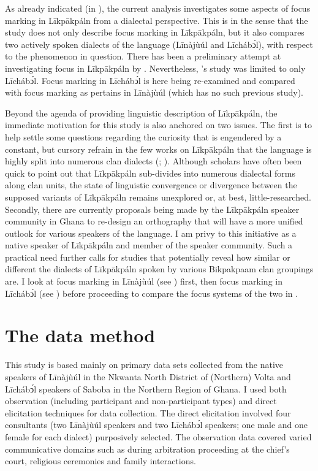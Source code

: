\documentclass[output=paper,colorlinks,citecolor=brown]{langscibook}
\begin{document}
As already indicated (in ), the current analysis investigates some aspects of focus marking in Līkpākpáln from a dialectal perspective. This is in the sense that the study does not only describe focus marking in Līkpākpáln, but it also compares two actively spoken dialects of the language (Līnàjùúl and Līchábͻ́l), with respect to the phenomenon in question. There has been a preliminary attempt at investigating focus in Līkpākpáln by \citet{Schwarz2009}. Nevertheless, \citeauthor{Schwarz2009}’s study was limited to only Līchábͻ́l. Focus marking in Līchábͻ́l is here being re-examined and compared with focus marking as pertains in Līnàjùúl (which has no such previous study).

Beyond the agenda of providing linguistic description of Līkpākpáln, the immediate motivation for this study is also anchored on two issues. The first is to help settle some questions regarding the curiosity that is engendered by a constant, but cursory refrain in the few works on Līkpākpáln that the language is highly split into numerous clan dialects (\citealt[182]{Schwarz2009}; \citealt[107]{Hasselbring2006}). Although scholars have often been quick to point out that Līkpākpáln sub-divides into numerous dialectal forms along clan units, the state of linguistic convergence or divergence between the supposed variants of Līkpākpáln remains unexplored or, at best, little-researched. Secondly, there are currently proposals being made by the Līkpākpáln speaker community in Ghana to re-design an orthography that will have a more unified outlook for various speakers of the language. I am privy to this initiative as a native speaker of Līkpākpáln and member of the speaker community. Such a practical need further calls for studies that potentially reveal how similar or different the dialects of Līkpākpáln spoken by various Bikpakpaam clan groupings are. I look at focus marking in Līnàjùúl (see ) first, then focus marking in Līchábͻ́l (see ) before proceeding to compare the focus systems of the two in .

\section{The data method}\label{sec:bisilki:4}

This study is based mainly on primary data sets collected from the native speakers of Līnàjùúl in the Nkwanta North District of (Northern) Volta and Līchábͻ́l speakers of Saboba in the Northern Region of Ghana. I used both observation (including participant and non-participant types) and direct elicitation techniques for data collection. The direct elicitation involved four consultants (two Līnàjùúl speakers and two Līchábͻ́l speakers; one male and one female for each dialect) purposively selected. The observation data covered varied communicative domains such as during arbitration proceeding at the chief’s court, religious ceremonies and family interactions.
\end{document}
